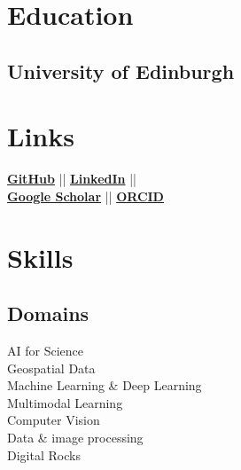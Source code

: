 \documentclass[]{deedy-resume-openfont}
\begin{document}
%
%
\lastupdated

%
%

%
%

\begin{minipage}[t]{0.33\textwidth} 


\section{Education} 
\subsection{University of Edinburgh}


\section{Links} 
\href{https://github.com/yi-li-yang}{\bf GitHub} ||
\href{https://www.linkedin.com/in/yiliyang}{\bf LinkedIn} ||\\
\href{https://scholar.google.com/citations?&user=8I00DowAAAAJ}{\bf Google Scholar} ||
\href{https://orcid.org/0000-0002-1791-3899}{\textbf{ORCID}}
\sectionsep


\section{Skills}
\subsection{Domains}
AI for Science
\\
Geospatial Data
\\
Machine Learning \& Deep Learning 
\\
Multimodal Learning
\\
Computer Vision
\\
Data \& image processing
\\
Digital Rocks
\sectionsep


\end{minipage}
\end{document}
